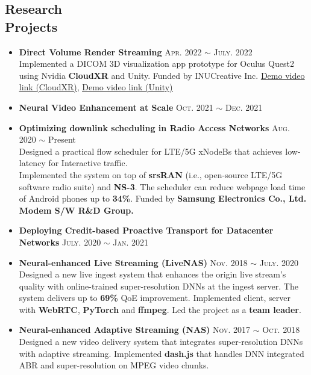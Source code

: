 \documentclass[margin,line,letter]{cv}
\def \pubitem {\vspace{0.07in}\item}
\newcommand{\video}[1]{\underline{\textsf{\small{#1}}}}
\begin{document}
\begin{resume}
\section{\sc Research \\ Projects \\}   
\begin{itemize}[leftmargin=*]
	\item{\textbf{Direct Volume Render Streaming} \hfill \textsc{Apr.} 2022 $\sim$ \textsc{July}. 2022 
	\\ Implemented a DICOM 3D visualization app prototype for Oculus Quest2 using Nvidia \textbf{CloudXR} and Unity. 
	Funded by INUCreative Inc.
	\href{https://youtu.be/H_05eXnPR8I}{\video{Demo video link (CloudXR)}}, \href{https://youtu.be/D6MKOwsuRXU}{\video{Demo video link (Unity)}}}
	\pubitem{\textbf{Neural Video Enhancement at Scale} \hfill \textsc{Oct.} 2021 $\sim$ \textsc{Dec.} 2021}
	\pubitem{\textbf{Optimizing downlink scheduling in Radio Access Networks} \hfill \textsc{Aug.} 2020 $\sim$ Present
	\\ Designed a practical flow scheduler for LTE/5G xNodeBs that achieves low-latency for Interactive traffic. 
	\\ Implemented the system on top of \textbf{srsRAN} (i.e., open-source LTE/5G software radio suite) 
	and \textbf{NS-3}. The scheduler can reduce webpage load time of Android phones up to \textbf{34\%}.
	Funded by \textbf{Samsung Electronics Co., Ltd. Modem S/W R\&D Group.}}
	\pubitem{\textbf{Deploying Credit-based Proactive Transport for Datacenter Networks}} \hfill \textsc{July.} 2020 $\sim$ \textsc{Jan.} 2021
	\pubitem{\textbf{Neural-enhanced Live Streaming (LiveNAS)} \hfill \textsc{Nov.} 2018 $\sim$ \textsc{July.} 2020
	\\ Designed a new live ingest system that enhances the origin live stream’s quality with online-trained super-resolution DNNs at the ingest server. The system delivers up to \textbf{69\%} QoE improvement. 
	Implemented client, server with \textbf{WebRTC}, \textbf{PyTorch} and \textbf{ffmpeg}. Led the project as a \textbf{team leader}.}
	\pubitem{\textbf{Neural-enhanced Adaptive Streaming (NAS)} \hfill \textsc{Nov.} 2017 $\sim$ \textsc{Oct.} 2018 \\ Designed a new video delivery system that integrates super-resolution DNNs with adaptive streaming. 
	Implemented \textbf{dash.js} that handles DNN integrated ABR and super-resolution on MPEG video chunks.}
\end{itemize}

\vspace{0.2cm}


\end{resume}
\end{document}
